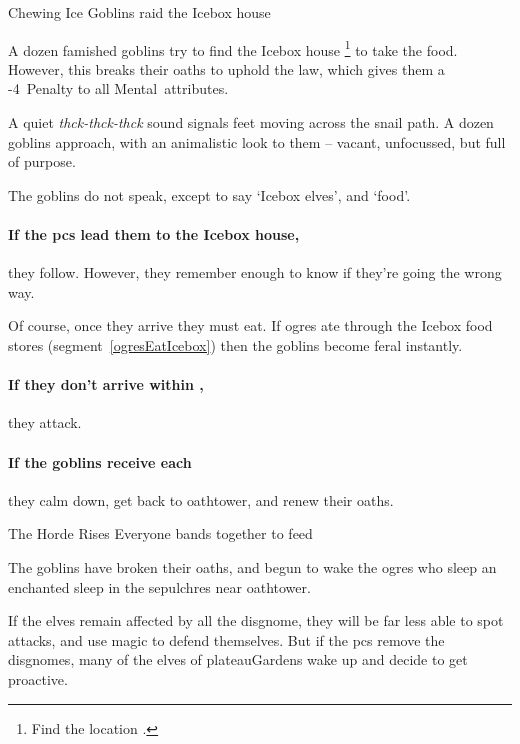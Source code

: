 \begin{multicols}{2}
{Chewing Ice}%
{Goblins raid the Icebox house}%

A dozen famished goblins try to find the Icebox house%
\footnote{Find the location .}
to take the food.
However, this breaks their oaths to uphold the law, which gives them a -4~Penalty to all Mental~\glspl{attribute}.

\begin{boxtext}
  A quiet \textit{thck-thck-thck} sound signals feet moving across the snail path.
  A dozen goblins approach, with an animalistic look to them -- vacant, unfocussed, but full of purpose.
\end{boxtext}

The goblins do not speak, except to say `Icebox elves', and `food'.

\paragraph{If the \glspl{pc} lead them to the Icebox house,}
they follow.
However, they remember enough to know if they're going the wrong way.

Of course, once they arrive they must eat.
If \glspl{ogre} ate through the Icebox food stores (\gls{segment}~\vref{ogresEatIcebox}) then the goblins become feral instantly.


\paragraph{If they don't arrive within ,}
they attack.

\paragraph{If the goblins receive  each}
they calm down, get back to \gls{oathtower}, and renew their oaths.


{The Horde Rises}%
{Everyone bands together to feed}%

The goblins have broken their oaths, and begun to wake the \glspl{ogre} who sleep an enchanted sleep in the \glspl{sepulchre} near \gls{oathtower}.

\goblin


\noindent
If the elves remain affected by all the \gls{disgnome}, they will be far less able to spot attacks, and use magic to defend themselves.
But if the \glspl{pc} remove the \glspl{disgnome},
many of the elves of \gls{plateauGardens} wake up and decide to get proactive.


\end{multicols}
